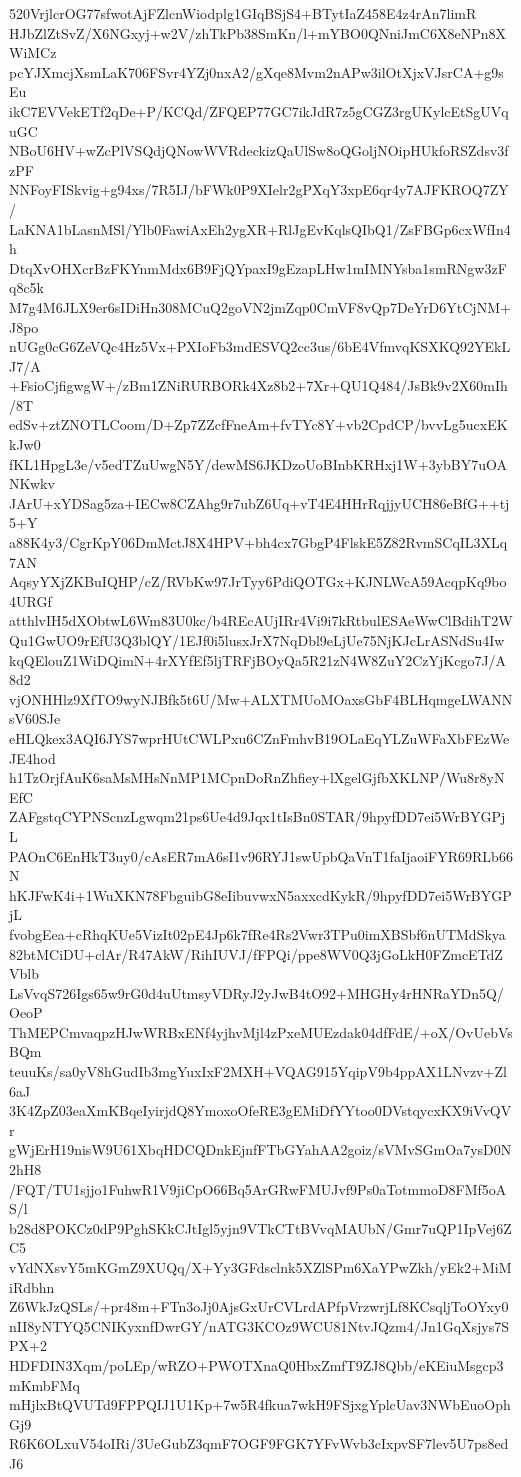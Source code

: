 520VrjlcrOG77sfwotAjFZlcnWiodplg1GIqBSjS4+BTytIaZ458E4z4rAn7limR
HJbZlZtSvZ/X6NGxyj+w2V/zhTkPb38SmKn/l+mYBO0QNniJmC6X8eNPn8XWiMCz
pcYJXmcjXsmLaK706FSvr4YZj0nxA2/gXqe8Mvm2nAPw3ilOtXjxVJsrCA+g9sEu
ikC7EVVekETf2qDe+P/KCQd/ZFQEP77GC7ikJdR7z5gCGZ3rgUKylcEtSgUVquGC
NBoU6HV+wZcPlVSQdjQNowWVRdeckizQaUlSw8oQGoljNOipHUkfoRSZdsv3fzPF
NNFoyFISkvig+g94xs/7R5IJ/bFWk0P9XIelr2gPXqY3xpE6qr4y7AJFKROQ7ZY/
LaKNA1bLasnMSl/Ylb0FawiAxEh2ygXR+RlJgEvKqlsQIbQ1/ZsFBGp6cxWfIn4h
DtqXvOHXcrBzFKYnmMdx6B9FjQYpaxI9gEzapLHw1mIMNYsba1smRNgw3zFq8c5k
M7g4M6JLX9er6sIDiHn308MCuQ2goVN2jmZqp0CmVF8vQp7DeYrD6YtCjNM+J8po
nUGg0cG6ZeVQc4Hz5Vx+PXIoFb3mdESVQ2cc3us/6bE4VfmvqKSXKQ92YEkLJ7/A
+FsioCjfigwgW+/zBm1ZNiRURBORk4Xz8b2+7Xr+QU1Q484/JsBk9v2X60mIh/8T
edSv+ztZNOTLCoom/D+Zp7ZZcfFneAm+fvTYc8Y+vb2CpdCP/bvvLg5ucxEKkJw0
fKL1HpgL3e/v5edTZuUwgN5Y/dewMS6JKDzoUoBInbKRHxj1W+3ybBY7uOANKwkv
JArU+xYDSag5za+IECw8CZAhg9r7ubZ6Uq+vT4E4HHrRqjjyUCH86eBfG++tj5+Y
a88K4y3/CgrKpY06DmMctJ8X4HPV+bh4cx7GbgP4FlskE5Z82RvmSCqIL3XLq7AN
AqsyYXjZKBuIQHP/cZ/RVbKw97JrTyy6PdiQOTGx+KJNLWcA59AcqpKq9bo4URGf
atthlvIH5dXObtwL6Wm83U0kc/b4REcAUjIRr4Vi9i7kRtbulESAeWwClBdihT2W
Qu1GwUO9rEfU3Q3blQY/1EJf0i5lusxJrX7NqDbl9eLjUe75NjKJcLrASNdSu4Iw
kqQElouZ1WiDQimN+4rXYfEf5ljTRFjBOyQa5R21zN4W8ZuY2CzYjKcgo7J/A8d2
vjONHHlz9XfTO9wyNJBfk5t6U/Mw+ALXTMUoMOaxsGbF4BLHqmgeLWANNsV60SJe
eHLQkex3AQI6JYS7wprHUtCWLPxu6CZnFmhvB19OLaEqYLZuWFaXbFEzWeJE4hod
h1TzOrjfAuK6saMsMHsNnMP1MCpnDoRnZhfiey+lXgelGjfbXKLNP/Wu8r8yNEfC
ZAFgstqCYPNScnzLgwqm21ps6Ue4d9Jqx1tIsBn0STAR/9hpyfDD7ei5WrBYGPjL
PAOnC6EnHkT3uy0/cAsER7mA6sI1v96RYJ1swUpbQaVnT1faIjaoiFYR69RLb66N
hKJFwK4i+1WuXKN78FbguibG8eIibuvwxN5axxcdKykR/9hpyfDD7ei5WrBYGPjL
fvobgEea+cRhqKUe5VizIt02pE4Jp6k7fRe4Rs2Vwr3TPu0imXBSbf6nUTMdSkya
82btMCiDU+clAr/R47AkW/RihIUVJ/fFPQi/ppe8WV0Q3jGoLkH0FZmcETdZVblb
LsVvqS726Igs65w9rG0d4uUtmsyVDRyJ2yJwB4tO92+MHGHy4rHNRaYDn5Q/OeoP
ThMEPCmvaqpzHJwWRBxENf4yjhvMjl4zPxeMUEzdak04dfFdE/+oX/OvUebVsBQm
teuuKs/sa0yV8hGudIb3mgYuxIxF2MXH+VQAG915YqipV9b4ppAX1LNvzv+Zl6aJ
3K4ZpZ03eaXmKBqeIyirjdQ8YmoxoOfeRE3gEMiDfYYtoo0DVstqycxKX9iVvQVr
gWjErH19nisW9U61XbqHDCQDnkEjnfFTbGYahAA2goiz/sVMvSGmOa7ysD0N2hH8
/FQT/TU1sjjo1FuhwR1V9jiCpO66Bq5ArGRwFMUJvf9Ps0aTotmmoD8FMf5oAS/l
b28d8POKCz0dP9PghSKkCJtIgl5yjn9VTkCTtBVvqMAUbN/Gmr7uQP1IpVej6ZC5
vYdNXsvY5mKGmZ9XUQq/X+Yy3GFdsclnk5XZlSPm6XaYPwZkh/yEk2+MiMiRdbhn
Z6WkJzQSLs/+pr48m+FTn3oJj0AjsGxUrCVLrdAPfpVrzwrjLf8KCsqljToOYxy0
nII8yNTYQ5CNIKyxnfDwrGY/nATG3KCOz9WCU81NtvJQzm4/Jn1GqXsjys7SPX+2
HDFDIN3Xqm/poLEp/wRZO+PWOTXnaQ0HbxZmfT9ZJ8Qbb/eKEiuMsgcp3mKmbFMq
mHjlxBtQVUTd9FPPQIJ1U1Kp+7w5R4fkua7wkH9FSjxgYplcUav3NWbEuoOphGj9
R6K6OLxuV54oIRi/3UeGubZ3qmF7OGF9FGK7YFvWvb3cIxpvSF7lev5U7ps8edJ6
